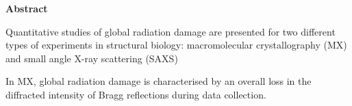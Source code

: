\newenvironment{abstract}%
{\cleardoublepage\thispagestyle{empty}\null\vfill\begin{center}%
\bfseries Abstract\end{center}}%
{\vfill\null}
\begin{abstract}
\small
\singlespacing
Quantitative studies of global radiation damage are presented for two different types of experiments in structural biology: macromolecular crystallography (MX) and small angle X-ray scattering (SAXS)

In MX, global radiation damage is characterised by an overall loss in the diffracted intensity of Bragg reflections during data collection.
\end{abstract}
